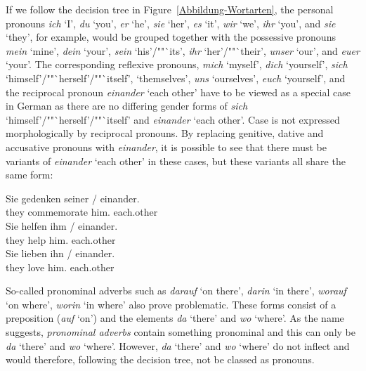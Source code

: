 If we follow the decision tree in Figure~\ref{Abbildung-Wortarten}, the personal
pronouns \emph{ich} `I', \emph{du} `you', \emph{er} `he', \emph{sie} `her', \emph{es} `it',
\emph{wir} `we', \emph{ihr} `you', and \emph{sie} `they', for example, would be grouped together
with the possessive pronouns \emph{mein} `mine', \emph{dein} `your', \emph{sein} `his'/""`its',
\emph{ihr} `her'/""`their', \emph{unser} `our', and \emph{euer} `your'. The corresponding reflexive pronouns,
\emph{mich} `myself', \emph{dich} `yourself', \emph{sich} `himself'/""`herself'/""`itself',
`themselves', \emph{uns} `ourselves', \emph{euch} `yourself', and the reciprocal pronoun
\emph{einander} `each other' have to be viewed as a special case in German as there are no differing
gender forms of \emph{sich} `himself'/""`herself'/""`itself' and \emph{einander} `each other'. Case is
not expressed morphologically by reciprocal pronouns. By replacing genitive, dative and accusative
pronouns with \emph{einander}, it is possible to see that there must be variants of \emph{einander}
`each other' in these cases, but these variants all share the same form:

\eal
\ex 
\gll Sie gedenken seiner / einander.\\
	 they commemorate him.\gen{} {} each.other\\
\ex 
\gll Sie helfen ihm / einander.\\
	 they help him.\dat{} {} each.other\\
\ex 
\gll Sie lieben ihn / einander.\\
	 they love him.\acc{} {} each.other\\
\zl
%

\addlines
So-called pronominal adverbs such as \emph{darauf} `on there', \emph{darin} `in there', \emph{worauf} `on where', \emph{worin} `in where'
also prove problematic. These forms consist of a preposition (\eg \emph{auf} `on') and the elements \emph{da} `there' and \emph{wo} `where'. As the name suggests,
\emph{pronominal adverbs} contain something pronominal and this can only be \emph{da} `there' and
\emph{wo} `where'. However, \emph{da} `there' and \emph{wo} `where'  do not inflect and would therefore,
following the decision tree, not be classed as pronouns.

